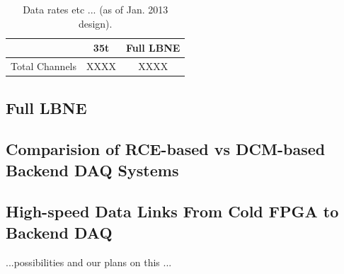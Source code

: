 \begin{table}[tbh]
\begin{center}
\begin{tabular}{|l|c|c|}   
\hline \hline 
    & 35t  & Full LBNE \\      
\hline
   Total Channels        & XXXX&XXXX \\ 
\hline \hline
\end{tabular}
\caption[]{Data rates etc ...   (as of Jan. 2013 design).}
\label{tab:datarates} 
\end{center}
\end{table}

\subsection{Full LBNE}



\subsection{Comparision of RCE-based vs DCM-based Backend DAQ Systems}






\subsection{High-speed Data Links From Cold FPGA to Backend DAQ}

...possibilities and our plans on this ...

